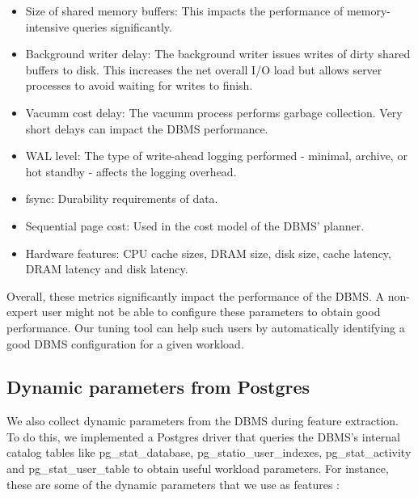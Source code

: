   \begin{itemize}
    \item {Size of shared memory buffers: This impacts the performance of
    memory-intensive queries significantly.}
    \item {Background writer delay: The background writer issues writes of
    dirty shared buffers to disk. This increases the net overall I/O load but
    allows server processes to avoid waiting for writes to finish.}
    \item {Vacumm cost delay: The vacumm process performs garbage 
    collection. Very short delays can impact the DBMS performance.}
    \item {WAL level: The type of write-ahead logging performed - minimal,
    archive, or hot standby - affects the logging overhead.}
    \item {fsync: Durability requirements of data.}
    \item {Sequential page cost: Used in the cost model of the DBMS' planner.}
	\item {Hardware features: CPU cache sizes, DRAM size, disk size, cache latency,
	DRAM latency and disk latency.}
  \end{itemize}
  
  Overall, these metrics significantly impact the performance of the DBMS. A
  non-expert user might not be able to configure these parameters to obtain
  good performance. Our tuning tool can help such users by automatically
  identifying a good DBMS configuration for a given workload.  
  
\subsection{Dynamic parameters from Postgres}
  
  We also collect dynamic parameters from the DBMS during feature extraction.
  To do this, we implemented a Postgres driver that queries the DBMS's internal
  catalog tables like pg\_stat\_database, pg\_statio\_user\_indexes,
  pg\_stat\_activity and pg\_stat\_user\_table
  to obtain useful workload parameters. For instance, these are some of the
  dynamic parameters that we use as features :\\
  
